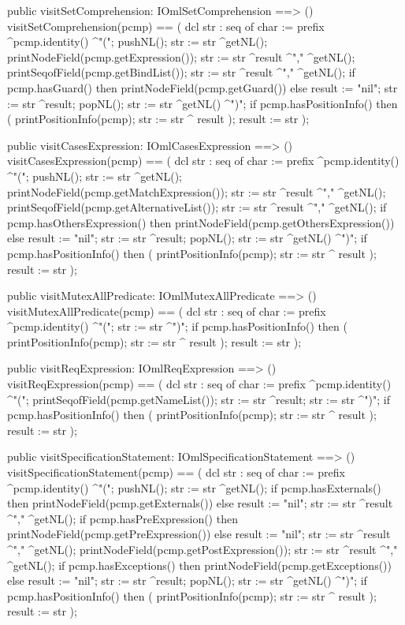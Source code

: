 \begin{vdm_al}
  public visitSetComprehension: IOmlSetComprehension ==> ()
  visitSetComprehension(pcmp) ==
    ( dcl str : seq of char := prefix ^pcmp.identity() ^"(";
      pushNL();
      str := str ^getNL();
      printNodeField(pcmp.getExpression());
      str := str ^result ^"," ^getNL();
      printSeqofField(pcmp.getBindList());
      str := str ^result ^"," ^getNL();
      if pcmp.hasGuard()
      then printNodeField(pcmp.getGuard())
      else result := "nil";
      str := str ^result;
      popNL();
      str := str ^getNL() ^")";
      if pcmp.hasPositionInfo()
      then ( printPositionInfo(pcmp);
             str := str ^ result );
      result := str );

  public visitCasesExpression: IOmlCasesExpression ==> ()
  visitCasesExpression(pcmp) ==
    ( dcl str : seq of char := prefix ^pcmp.identity() ^"(";
      pushNL();
      str := str ^getNL();
      printNodeField(pcmp.getMatchExpression());
      str := str ^result ^"," ^getNL();
      printSeqofField(pcmp.getAlternativeList());
      str := str ^result ^"," ^getNL();
      if pcmp.hasOthersExpression()
      then printNodeField(pcmp.getOthersExpression())
      else result := "nil";
      str := str ^result;
      popNL();
      str := str ^getNL() ^")";
      if pcmp.hasPositionInfo()
      then ( printPositionInfo(pcmp);
             str := str ^ result );
      result := str );

  public visitMutexAllPredicate: IOmlMutexAllPredicate ==> ()
  visitMutexAllPredicate(pcmp) ==
    ( dcl str : seq of char := prefix ^pcmp.identity() ^"(";
      str := str ^")";
      if pcmp.hasPositionInfo()
      then ( printPositionInfo(pcmp);
             str := str ^ result );
      result := str );

  public visitReqExpression: IOmlReqExpression ==> ()
  visitReqExpression(pcmp) ==
    ( dcl str : seq of char := prefix ^pcmp.identity() ^"(";
      printSeqofField(pcmp.getNameList());
      str := str ^result;
      str := str ^")";
      if pcmp.hasPositionInfo()
      then ( printPositionInfo(pcmp);
             str := str ^ result );
      result := str );

  public visitSpecificationStatement: IOmlSpecificationStatement ==> ()
  visitSpecificationStatement(pcmp) ==
    ( dcl str : seq of char := prefix ^pcmp.identity() ^"(";
      pushNL();
      str := str ^getNL();
      if pcmp.hasExternals()
      then printNodeField(pcmp.getExternals())
      else result := "nil";
      str := str ^result ^"," ^getNL();
      if pcmp.hasPreExpression()
      then printNodeField(pcmp.getPreExpression())
      else result := "nil";
      str := str ^result ^"," ^getNL();
      printNodeField(pcmp.getPostExpression());
      str := str ^result ^"," ^getNL();
      if pcmp.hasExceptions()
      then printNodeField(pcmp.getExceptions())
      else result := "nil";
      str := str ^result;
      popNL();
      str := str ^getNL() ^")";
      if pcmp.hasPositionInfo()
      then ( printPositionInfo(pcmp);
             str := str ^ result );
      result := str );


\end{vdm_al}
